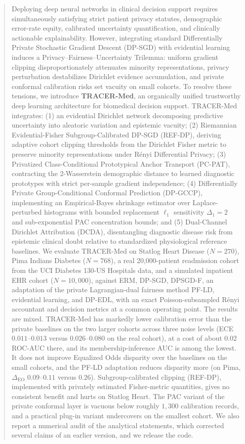 \documentclass[3p,12pt]{elsarticle}
\theoremstyle{plain}
\theoremstyle{definition}
\begin{document}
\begin{frontmatter}
\begin{abstract}
Deploying deep neural networks in clinical decision support requires simultaneously satisfying strict patient privacy statutes, demographic error-rate equity, calibrated uncertainty quantification, and clinically actionable explainability. However, integrating standard Differentially Private Stochastic Gradient Descent (DP-SGD) with evidential learning induces a Privacy--Fairness--Uncertainty Trilemma: uniform gradient clipping disproportionately attenuates minority representations, privacy perturbation destabilizes Dirichlet evidence accumulation, and private conformal calibration risks set vacuity on small cohorts. To resolve these tensions, we introduce \textbf{TRACER-Med}, an organically unified trustworthy deep learning architecture for biomedical decision support. TRACER-Med integrates: (1) an evidential Dirichlet network decomposing predictive uncertainty into aleatoric variation and epistemic vacuity; (2) Riemannian Evidential-Fisher Subgroup-Calibrated DP-SGD (REF-DP), deriving adaptive cohort clipping thresholds from the Dirichlet Fisher metric to preserve minority representations under Rényi Differential Privacy; (3) Privatized Class-Conditional Prototypical Anchor Transport (PC-PAT), contracting the 2-Wasserstein demographic distance to learned diagnostic prototypes with strict per-sample gradient independence; (4) Differentially Private Group-Conditional Conformal Prediction (DP-GCCP), implementing an Empirical-Bayes shrinkage estimator over Laplace-perturbed histograms with bounded replacement $\ell_1$ sensitivity $\Delta_1 = 2$ and sub-exponential PAC concentration bounds; and (5) Dual-Channel Dirichlet Attribution (DCDA), disentangling diagnostic disease risk from epistemic clinical doubt relative to standardized physiological reference baselines. We evaluate TRACER-Med on Statlog Heart Disease ($N=270$), Pima Indians Diabetes ($N=768$), a real 20,000-patient readmission cohort from the UCI Diabetes 130-US Hospitals data, and a simulated inpatient EHR cohort ($N=10{,}000$), against ERM, DP-SGD, DPSGD-F, an adaptation of the private Lagrangian-dual fairness method PF-LD, evidential learning, and DP-EDL, with an exact Poisson-subsampled R\'enyi accountant and decision metrics at a common operating point. The results are mixed. TRACER-Med has markedly lower calibration error than the private baselines on the two larger cohorts across three noise levels (ECE $0.011$--$0.013$ versus $0.026$--$0.080$ on the real cohort), at a cost of about $0.02$ ROC-AUC there, and its membership-inference AUC is among the lowest. It does not improve Equalized Odds disparity over the baselines on the small cohorts, and the PF-LD adaptation reduces disparity more (on Pima, $\Delta_{\text{EO}}$ $0.09$--$0.11$ versus $0.26$). Subgroup-calibrated clipping (REF-DP), implemented with privately estimated Fisher-metric quantities, gives no consistent benefit and hurts on Statlog Heart. The PAC variant of the private conformal layer is vacuous below roughly $1{,}300$ calibration records, and a practical plug-in variant undercovers on the smallest cohort. We also report a numerical audit of the analytical statements, which corrected several claims of an earlier version, and we release the code.

\end{abstract}
\end{frontmatter}
\end{document}

